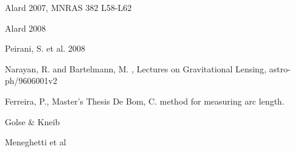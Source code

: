 
\begin{thebibliography}{99}

 Alard 2007, MNRAS 382 L58-L62

 Alard 2008

 Peirani, S. et al. 2008

 Narayan, R. and Bartelmann, M. , Lectures on Gravitational Lensing, astro-ph/9606001v2

 Ferreira, P., Master's Thesis
 De Bom, C. method for measuring arc length.

 Golse \& Kneib

 Meneghetti et al


\end{thebibliography}



